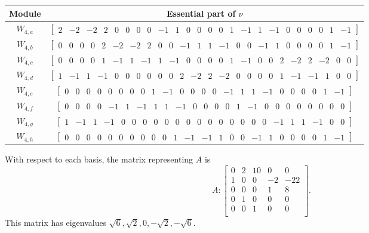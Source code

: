 \documentclass[12pt,letterpaper]{article}
\newcommand{\rowvector}[1]{\begin{bmatrix} #1 \end{bmatrix}}
\begin{document}
{
\setlength{\arraycolsep}{3pt}
\begin{center}
    \begin{tabular}{c | c}
    \toprule
       \textbf{Module}  & \textbf{Essential part of }$\nu$ \\
       \midrule
       $W_{4,a}$ & $\rowvector{2 & -2 & -2 & 2 & 0 & 0 & 0 & 0 & -1 & 1 & 0 & 0 & 0 & 0 & 1 & -1 & 1 & -1 & 0 & 0 & 0 & 0 & 1 & -1}$ \\[1.67pt]
       $W_{4,b}$ & $\rowvector{0 & 0 & 0 & 0 & 2 & -2 & -2 & 2 & 0 & 0 & -1 & 1 & 1 & -1 & 0 & 0 & -1 & 1 & 0 & 0 & 0 & 0 & 1 & -1}$ \\[1.67pt]
       $W_{4,c}$ & $\rowvector{0 & 0 & 0 & 0 & 1 & -1 & 1 & -1 & 1 & -1 & 0 & 0 & 0 & 0 & 1 & -1 & 0 & 0 & 2 & -2 & 2 & -2 & 0 & 0}$ \\[1.67pt]
       $W_{4,d}$ & $\rowvector{1 & -1 & 1 & -1 & 0 & 0 & 0 & 0 & 0 & 0 & 2 & -2 & 2 & -2 & 0 & 0 & 0 & 0 & 1 & -1 & -1 & 1 & 0 & 0}$ \\[1.67pt]
       $W_{4,e}$ & $\rowvector{0 & 0 & 0 & 0 & 0 & 0 & 0 & 0 & 1 & -1 & 0 & 0 & 0 & 0 & -1 & 1 & 1 & -1 & 0 & 0 & 0 & 0 & 1 & -1}$ \\[1.67pt]
       $W_{4,f}$ & $\rowvector{0 & 0 & 0 & 0 & -1 & 1 & -1 & 1 & 1 & -1 & 0 & 0 & 0 & 0 & 1 & -1 & 0 & 0 & 0 & 0 & 0 & 0 & 0 & 0}$ \\[1.67pt]
       $W_{4,g}$ & $\rowvector{1 & -1 & 1 & -1 & 0 & 0 & 0 & 0 & 0 & 0 & 0 & 0 & 0 & 0 & 0 & 0 & 0 & 0 & -1 & 1 & 1 & -1 & 0 & 0}$ \\[1.67pt]
       $W_{4,h}$ & $\rowvector{0 & 0 & 0 & 0 & 0 & 0 & 0 & 0 & 0 & 0 & 1 & -1 & -1 & 1 & 0 & 0 & -1 & 1 & 0 & 0 & 0 & 0 & 1 & -1}$ \\
    \bottomrule
    \end{tabular}
\end{center}
}

With respect to each basis, the matrix representing $A$ is 
\begin{equation}
    A: \begin{bmatrix}
 0 & 2 & 10 & 0 & 0 \\
 1 & 0 & 0 & -2 & -22 \\
 0 & 0 & 0 & 1 & 8 \\
 0 & 1 & 0 & 0 & 0 \\
 0 & 0 & 1 & 0 & 0 \\
\end{bmatrix}.
\label{eq:t12v2-V}
\end{equation}
This matrix has eigenvalues $\sqrt{6}, \sqrt{2}, 0, -\sqrt{2}, -\sqrt{6}$.
\end{document}
